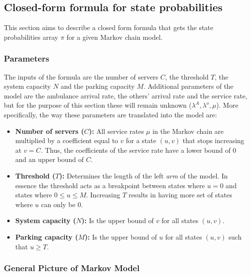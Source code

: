 \subsection{Closed-form formula for state probabilities}

This section aims to describe a closed form formula that gets the state probabilities array \(\pi\) for a given Markov chain model.

\subsubsection{Parameters}
The inputs of the formula are the number of servers \(C\), the threshold \(T\), the system capacity \(N\) and the parking capacity \(M\). Additional parameters of the model are the ambulance arrival rate, the others' arrival rate and the service rate, but for the purpose of this section these will remain unknown (\(\lambda^A, \lambda^o, \mu\)). More specifically, the way these parameters are translated into the model are:

\begin{itemize}
    \item \textbf{Number of servers (\(C\)):} All service rates \(\mu\) in the Markov chain are multiplied by a coefficient equal to \(v\) for a state \((u,v)\) that stops increasing at \(v=C\). Thus, the coefficients of the service rate have a lower bound of \(0\) and an upper bound of \(C\).
    \item \textbf{Threshold (\(T\)):} Determines the length of the left \textit{arm} of the model. In essence the threshold acts as a breakpoint between states where \(u=0\) and states where \(0 \leq u \leq M\). Increasing \(T\) results in having more set of states where \(u\) can only be \(0\).
    \item \textbf{System capacity (\(N\)):} Is the upper bound of \(v\) for all states \((u,v)\).
    \item \textbf{Parking capacity (\(M\)):} Is the upper bound of \(u\) for all states \((u,v)\) such that \(u \geq T\).
\end{itemize}


\subsubsection{General Picture of Markov Model}
